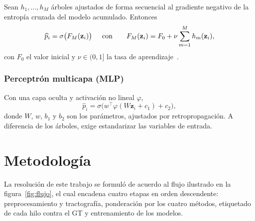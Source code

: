 \documentclass[11pt,a4paper]{article}
\begin{document}
Sean $h_1,\dots,h_M$ árboles ajustados de forma secuencial al gradiente negativo de la entropía cruzada del modelo acumulado. Entonces
\[
  \widehat{p}_i=\sigma\big(F_M(\mathbf{z}_i)\big)  \hspace{0.2in} \text{con} \qquad F_M(\mathbf{z}_i)=F_0+\nu\sum_{m=1}^{M}h_m(\mathbf{z}_i),
\]
con $F_0$ el valor inicial y $\nu\in(0,1]$ la tasa de aprendizaje~\cite{friedman2001}.

\subsubsection{Perceptrón multicapa (MLP)}

Con una capa oculta y activación no lineal $\varphi$,
\[
    \widehat{p}_i=\sigma\big(w^{\top}\varphi(W\mathbf{z}_i+c_1)+c_2\big),
\]
donde $W$, $w$, $b_1$ y $b_2$ son los par\'ametros, ajustados por retropropagación. A diferencia de los árboles, exige estandarizar las variables de entrada.

\section{Metodología}

La resolución de este trabajo se formuló de acuerdo al flujo ilustrado en la figura~\ref{fig:flujo}, el cual encadena cuatro etapas en orden descendente: preprocesamiento y tractografía, ponderación por los cuatro métodos, etiquetado de cada hilo contra el GT y entrenamiento de los modelos. 
\end{document}
